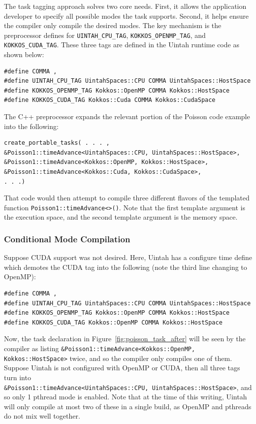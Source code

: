 \documentclass[]{article}
\begin{document}
The task tagging approach solves two core needs.  First, it allows the application developer to specify all possible modes the task supports.  Second, it helps ensure the compiler only compile the desired modes.  The key mechanism is the preprocessor defines for \texttt{UINTAH\_CPU\_TAG}, \texttt{KOKKOS\_OPENMP\_TAG}, and \texttt{KOKKOS\_CUDA\_TAG}. These three tags are defined in the Uintah runtime code as shown below:
\vspace{-0.05in}
\begin{lstlisting}
#define COMMA ,
#define UINTAH_CPU_TAG UintahSpaces::CPU COMMA UintahSpaces::HostSpace
#define KOKKOS_OPENMP_TAG Kokkos::OpenMP COMMA Kokkos::HostSpace
#define KOKKOS_CUDA_TAG Kokkos::Cuda COMMA Kokkos::CudaSpace
\end{lstlisting}

The C++ preprocessor expands the relevant portion of the Poisson code example into the following:
\vspace{-0.05in}
\begin{lstlisting}
create_portable_tasks( . . . , 
&Poisson1::timeAdvance<UintahSpaces::CPU, UintahSpaces::HostSpace>,
&Poisson1::timeAdvance<Kokkos::OpenMP, Kokkos::HostSpace>,
&Poisson1::timeAdvance<Kokkos::Cuda, Kokkos::CudaSpace>,
. . .)
\end{lstlisting}

That code would then attempt to compile three different flavors of the templated function \texttt{Poisson1::timeAdvance<>()}.   Note that the first template argument is the execution space, and the second template argument is the memory space.  


\subsubsection{Conditional Mode Compilation}

Suppose CUDA support was not desired.  Here, Uintah has a configure time define which demotes the CUDA tag into the following (note the third line changing to OpenMP):

\begin{lstlisting}
#define COMMA ,
#define UINTAH_CPU_TAG UintahSpaces::CPU COMMA UintahSpaces::HostSpace
#define KOKKOS_OPENMP_TAG Kokkos::OpenMP COMMA Kokkos::HostSpace
#define KOKKOS_CUDA_TAG Kokkos::OpenMP COMMA Kokkos::HostSpace
\end{lstlisting}

Now, the task declaration in Figure~\ref{fig:poisson_task_after} will be seen by the compiler as listing \texttt{\&Poisson1::timeAdvance<Kokkos::OpenMP, Kokkos::HostSpace>} twice, and so the compiler only compiles one of them.  Suppose Uintah is not configured with OpenMP or CUDA, then all three tags turn into \\ \texttt{\&Poisson1::timeAdvance<UintahSpaces::CPU, UintahSpaces::HostSpace>}, and so only 1 pthread mode is enabled.  Note that at the time of this writing, Uintah will only compile at most two of these in a single build, as OpenMP and pthreads do not mix well together.  
\end{document}
